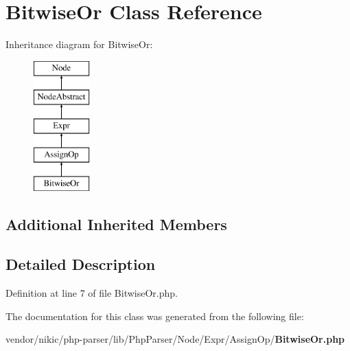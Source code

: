 \section{Bitwise\+Or Class Reference}
\label{class_php_parser_1_1_node_1_1_expr_1_1_assign_op_1_1_bitwise_or}
Inheritance diagram for Bitwise\+Or\+:\begin{figure}[H]
\begin{center}
\leavevmode
\includegraphics[height=5.000000cm]{class_php_parser_1_1_node_1_1_expr_1_1_assign_op_1_1_bitwise_or}
\end{center}
\end{figure}
\subsection*{Additional Inherited Members}


\subsection{Detailed Description}


Definition at line 7 of file Bitwise\+Or.\+php.



The documentation for this class was generated from the following file\+:\begin{DoxyCompactItemize}
\item 
vendor/nikic/php-\/parser/lib/\+Php\+Parser/\+Node/\+Expr/\+Assign\+Op/{\bf Bitwise\+Or.\+php}\end{DoxyCompactItemize}
